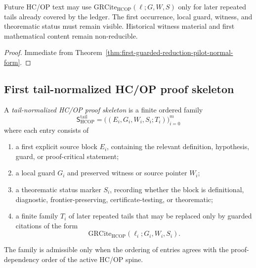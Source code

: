 \begin{corollary}
\label{cor:v3340-r13-working-rule}
Future HC/OP text may use \(\mathrm{GRCite}_{\mathrm{HCOP}}(\ell;G,W,S)\) only for later repeated tails already covered by the ledger. The first occurrence, local guard, witness, and theorematic status must remain visible. Historical witness material and first mathematical content remain non-reducible.
\end{corollary}

\begin{proof}
Immediate from Theorem~\ref{thm:first-guarded-reduction-pilot-normal-form}.
\end{proof}

\subsection{First tail-normalized HC/OP proof skeleton}
\label{subsec:first-tail-normalized-hcop-proof-skeleton}

\begin{definition}
\label{def:tail-normalized-hcop-proof-skeleton}
A \emph{tail-normalized HC/OP proof skeleton} is a finite ordered family
\[
 \mathsf S_{\mathrm{HCOP}}^{\mathrm{tail}}
 =
 \bigl((E_i,G_i,W_i,S_i;T_i)\bigr)_{i=0}^{m}
\]
where each entry consists of
\begin{enumerate}[leftmargin=2em,label=(\roman*)]
 \item a first explicit source block \(E_i\), containing the relevant definition, hypothesis, guard, or proof-critical statement;
 \item a local guard \(G_i\) and preserved witness or source pointer \(W_i\);
 \item a theorematic status marker \(S_i\), recording whether the block is definitional, diagnostic, frontier-preserving, certificate-testing, or theorematic;
 \item a finite family \(T_i\) of later repeated tails that may be replaced only by guarded citations of the form
 \[
 \mathrm{GRCite}_{\mathrm{HCOP}}(\ell_i;G_i,W_i,S_i).
 \]
\end{enumerate}
The family is admissible only when the ordering of entries agrees with the proof-dependency order of the active HC/OP spine.
\end{definition}

